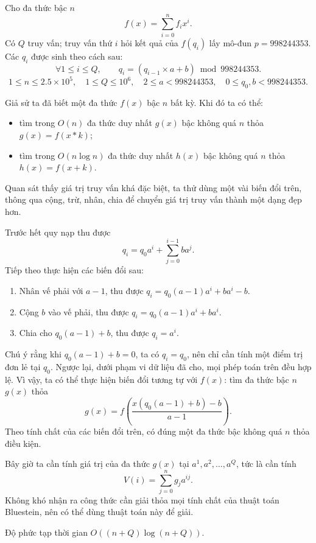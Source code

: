 \documentclass[11pt]{article}
\begin{document}
 Cho đa thức bậc \(n\)
\[
f(x)=\sum_{i=0}^{n}f_i x^i.
\]
Có \(Q\) truy vấn; truy vấn thứ \(i\) hỏi kết quả của \(f(q_i)\) lấy mô-đun
\(p=998244353\). Các \(q_i\) được sinh theo cách sau:
\[
\forall 1\le i\le Q,\qquad q_i=(q_{i-1}\times a+b)\bmod 998244353.
\]
\[
1\le n\le 2.5\times 10^5,\quad 1\le Q\le 10^6,\quad
2\le a<998244353,\quad 0\le q_0,b<998244353.
\]

 Giả sử ta đã biết một đa thức \(f(x)\) bậc \(n\) bất kỳ. Khi
đó ta có thể:

\begin{itemize}
  \item tìm trong \(O(n)\) đa thức duy nhất \(g(x)\) bậc không quá \(n\) thỏa
  \(g(x)=f(x*k)\);
  \item tìm trong \(O(n\log n)\) đa thức duy nhất \(h(x)\) bậc không quá \(n\)
  thỏa \(h(x)=f(x+k)\).
\end{itemize}

Quan sát thấy giá trị truy vấn khá đặc biệt, ta thử dùng một vài biến đổi trên,
thông qua cộng, trừ, nhân, chia để chuyển giá trị truy vấn thành một dạng đẹp
hơn.

Trước hết quy nạp thu được
\[
q_i=q_0a^i+\sum_{j=0}^{i-1}ba^j.
\]
Tiếp theo thực hiện các biến đổi sau:

\begin{enumerate}
  \item Nhân vế phải với \(a-1\), thu được
  \(q_i=q_0(a-1)a^i+ba^i-b\).
  \item Cộng \(b\) vào vế phải, thu được
  \(q_i=q_0(a-1)a^i+ba^i\).
  \item Chia cho \(q_0(a-1)+b\), thu được \(q_i=a^i\).
\end{enumerate}

Chú ý rằng khi \(q_0(a-1)+b=0\), ta có \(q_i=q_0\), nên chỉ cần tính một điểm
trị đơn lẻ tại \(q_0\). Ngược lại, dưới phạm vi dữ liệu đã cho, mọi phép toán
trên đều hợp lệ. Vì vậy, ta có thể thực hiện biến đổi tương tự với \(f(x)\):
tìm đa thức bậc \(n\) \(g(x)\) thỏa
\[
g(x)=f\left(\frac{x(q_0(a-1)+b)-b}{a-1}\right).
\]
Theo tính chất của các biến đổi trên, có đúng một đa thức bậc không quá \(n\)
thỏa điều kiện.

Bây giờ ta cần tính giá trị của đa thức \(g(x)\) tại
\(a^1,a^2,\ldots,a^Q\), tức là cần tính
\[
V(i)=\sum_{j=0}^{n}g_j a^{ij}.
\]
Không khó nhận ra công thức cần giải thỏa mọi tính chất của thuật toán
Bluestein, nên có thể dùng thuật toán này để giải.

Độ phức tạp thời gian \(O((n+Q)\log(n+Q))\).
\end{document}
